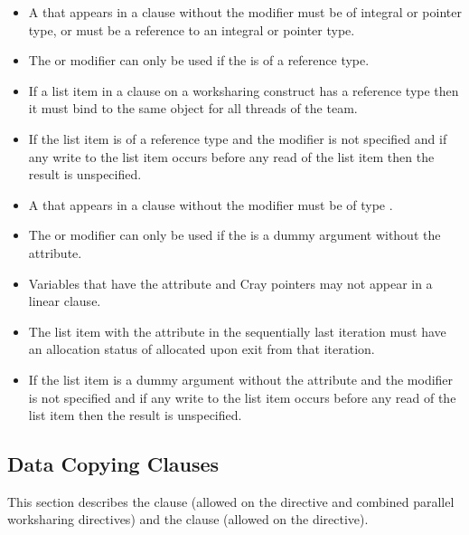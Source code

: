 {{{{\begin{itemize}
\cppspecificstart
\item A  that appears in a  clause without the  modifier must be of integral or pointer type, or must be a reference to an integral or pointer type. 
\item The  or  modifier can only be used if the  is of a reference type.
\item If a list item in a  clause on a worksharing
construct has a reference type then it must bind to the same object for all threads of the team.
\item If the list item is of a reference type and the  modifier is not specified and if any write to the list item occurs before any read of the list item then the result is unspecified.
\cppspecificend

\fortranspecificstart
\item A  that appears in a  clause without the  modifier must be of type .
\item The  or  modifier can only be used if the  is a dummy argument without the  attribute.
\item Variables that have the  attribute and Cray pointers may not appear in a linear clause. 
\item The list item with the  attribute in the sequentially last iteration must have an allocation status of allocated upon exit from that iteration. 
\item If the list item is a dummy argument without the  attribute and the  modifier is not specified and if any write to the list item occurs before any read of the list item then the result is unspecified.
\fortranspecificend
\end{itemize}





\subsection{Data Copying Clauses}
\label{subsec:Data Copying Clauses}
This section describes the  clause (allowed on the  directive and 
combined parallel worksharing directives) and the  clause (allowed on 
the  directive).

}}}}
